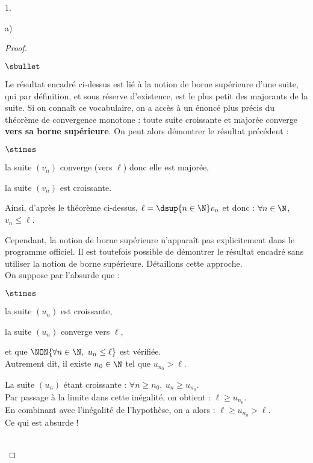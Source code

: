 \documentclass[11pt]{article}%
\begin{document}
\begin{noliste}{1.}
\begin{noliste}{a)}
\begin{proof}
\begin{remark}
\begin{noliste}{$\sbullet$}
          \item Le résultat encadré ci-dessus est lié à la notion de
            borne supérieure d'une suite, qui par définition, et sous
            réserve d'existence, est le plus petit des majorants de la
            suite. Si on connaît ce vocabulaire, on a accès à un
            énoncé plus précis du théorème de convergence monotone :
            toute suite croissante et majorée converge {\bf vers sa
              borne supérieure}. On peut alors démontrer le résultat
            précédent :
            \begin{noliste}{$\stimes$}
            \item la suite $(v_n)$ converge (vers $\ell$) donc elle
              est majorée,
            \item la suite $(v_n)$ est croissante.
            \end{noliste}
            Ainsi, d'après le théorème ci-dessus, $\ell = \dsup{n \in
              \N} v_n$ et donc : $\forall n \in \N$, $v_n \leq \ell$.

          \item Cependant, la notion de borne supérieure n'apparaît
            pas explicitement dans le programme officiel. Il est
            toutefois possible de démontrer le résultat encadré sans
            utiliser la notion de borne supérieure. Détaillons cette
            approche.\\[.2cm]
            On suppose par l'absurde que :
            \begin{liste}{$\stimes$}
            \item la suite $(u_n)$ est croissante,
            \item la suite $(u_n)$ converge vers $\ell$,
            \item et que $\NON{\forall n \in \N, \ u_n \leq \ell}$ est
              vérifiée.\\
              Autrement dit, il existe $n_0 \in \N$ tel que $u_{n_0} > \ell$.
            \end{liste}
            La suite $(u_n)$ étant croissante : $\forall n \geq
            n_0, \ u_n \geq u_{n_0}$.\\[.2cm]
            Par passage à la limite dans cette inégalité, on obtient :
            $\ell \geq u_{n_0}$.\\
            En combinant avec l'inégalité de l'hypothèse, on a alors :
            $\ell \geq u_{n_0} > \ell$.\\
            Ce qui est absurde !
          \end{noliste}
        \end{remark}~\\[-1.4cm]
      \end{proof}


\end{noliste}
\end{noliste}
\end{document}
